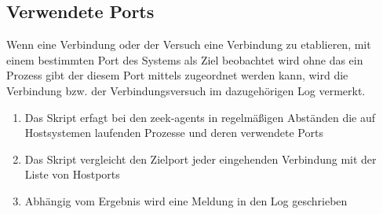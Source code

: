 \subsection{Verwendete Ports}
Wenn eine Verbindung oder der Versuch eine Verbindung zu etablieren, mit einem bestimmten Port des Systems als Ziel beobachtet wird ohne das ein Prozess gibt der diesem Port mittels zugeordnet werden kann, wird die Verbindung bzw. der Verbindungsversuch im dazugehörigen Log vermerkt.
\begin{enumerate}
\item{Das Skript erfagt bei den zeek-agents in regelmäßigen Abständen die auf Hostsystemen laufenden Prozesse und deren verwendete Ports}
\item{Das Skript vergleicht den Zielport jeder eingehenden Verbindung mit der Liste von Hostports}
\item{Abhängig vom Ergebnis wird eine Meldung in den Log geschrieben}
\end{enumerate}
